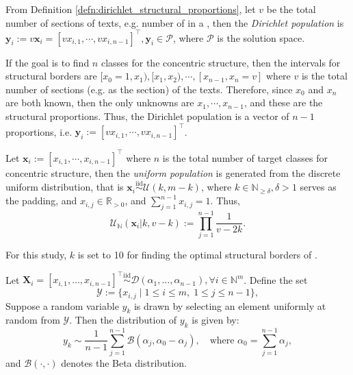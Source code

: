 \begin{defn}\label{defn:dirichlet_population}
    From Definition \ref{defn:dirichlet_structural_proportions}, let $v$ be the total number of sections of texts, e.g. number of   in a  , then the \textit{Dirichlet population} is $\mathbf{y}_i:=v\mathbf{x}_i=[vx_{i,1},\cdots,vx_{i,n-1}]^{\top},\mathbf{y}_i\in\mathscr{P}$, where $\mathscr{P}$ is the solution space.
\end{defn}
\begin{remark}
    If the goal is to find $n$ classes for the concentric structure, then the intervals for structural borders are $[x_0=1,x_1),[x_1,x_2),\cdots,[x_{n-1},x_n=v]$ where $v$ is the total number of sections (e.g.  \textnormal{} as the section) of the texts. Therefore, since $x_0$ and $x_n$ are both known, then the only unknowns are $x_1,\cdots,x_{n-1}$, and these are the structural proportions. Thus, the Dirichlet population is a vector of $n-1$ proportions, i.e. $\mathbf{y}_i:=[vx_{i,1},\cdots,vx_{i,n-1}]^{\top}$.
\end{remark}
\begin{defn}\label{defn:discrete_uniform_population}
    Let $\mathbf{x}_i:=[x_{i,1},\cdots,x_{i,n-1}]^{\top}$ where $n$ is the total number of target classes for concentric structure, then the \textit{uniform population} is generated from the discrete uniform distribution, that is $\mathbf{x}_i\overset{\text{iid}}{\sim}\mathcal{U}(k,m-k)$, where $k\in\mathbb{N}_{\geq \delta},\delta>1$ serves as the padding, and $x_{i,j}\in\mathbb{R}_{>0}$, and $\sum_{j=1}^{n-1}x_{i,j}=1$. Thus,
    \begin{equation}
        \mathcal{U}_{\mathbb{N}}(\mathbf{x}_i|k,v-k):=\prod_{j=1}^{n-1}\frac{1}{v-2k}.
    \end{equation}
\end{defn}
\begin{remark}
    For this study, $k$ is set to 10 for finding the optimal structural borders of  \textnormal{}.
\end{remark}
\begin{prop}\label{prop:mixture_beta_clean}
Let $\mathbf{X}_i = [x_{i,1}, \dots, x_{i,n-1}]^\top\overset{\text{iid}}{\sim}\mathcal{D}(\alpha_1, \dots, \alpha_{n-1}), \forall i \in\mathbb{N}^{m}$. Define the set
\[
\mathscr{Y} := \{x_{i,j} \mid 1 \le i \le m,\; 1 \le j \le n-1\},
\]
Suppose a random variable $y_k$ is drawn by selecting an element uniformly at random from $\mathscr{Y}$. Then the distribution of $y_k$ is given by:
\[
y_k \sim \frac{1}{n-1} \sum_{j=1}^{n-1} \mathcal{B}(\alpha_j, \alpha_0 - \alpha_j), \quad \text{where } \alpha_0 = \sum_{j=1}^{n-1} \alpha_j,
\]
and $\mathcal{B}(\cdot,\cdot)$ denotes the Beta distribution.
\end{prop}
    
